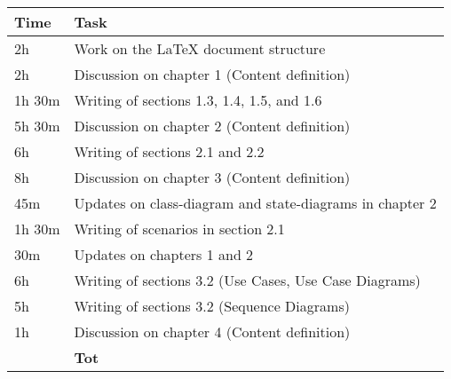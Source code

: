 \begin{center}
    {\renewcommand{\arraystretch}{2}%
    \begin{tabular}{L{2cm}L{12cm}}
        \hline
        \textbf{Time} & \textbf{Task} \\
        \hline
        2h & Work on the LaTeX document structure \\
        \hline
        2h & Discussion on chapter 1 (Content definition) \\
        \hline
        1h 30m& Writing of sections 1.3, 1.4, 1.5, and 1.6 \\
        \hline
        5h 30m & Discussion on chapter 2 (Content definition) \\
        \hline
        6h & Writing of sections 2.1 and 2.2 \\
        \hline
        8h & Discussion on chapter 3 (Content definition) \\
        \hline
        45m & Updates on class-diagram and state-diagrams in chapter 2 \\
        \hline
        1h 30m & Writing of scenarios in section 2.1 \\
        \hline
        30m & Updates on chapters 1 and 2 \\
        \hline
        6h & Writing of sections 3.2 (Use Cases, Use Case Diagrams) \\
        \hline
        5h & Writing of sections 3.2 (Sequence Diagrams) \\
        \hline
        1h & Discussion on chapter 4 (Content definition) \\
        \hline
        \textbf{} & \textbf{Tot} \\
    \end{tabular}}
\end{center}